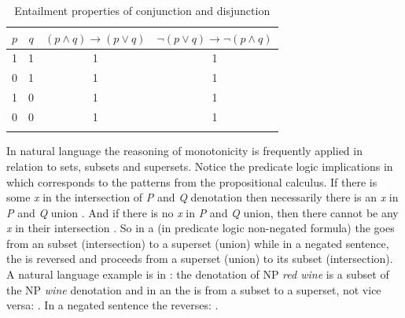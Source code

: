 \documentclass[output=paper, colorlinks, citecolor=brown, newtxmath]{langsci/langscibook}
\begin{document}
\ea \label{ex-10} 
\z
\z

\begin{table}
\begin{tabularx}{0.65\textwidth}{cccc}
\lsptoprule
$p$\strut & $q$\strut & $(p\wedge q)\rightarrow(p\vee q)$\strut & $\neg (p\vee q)\rightarrow\neg(p\wedge q)$\strut
\tabularnewline
\midrule
1\strut & 1\strut & 1\strut & 1\strut \tabularnewline
0\strut & 1\strut & 1\strut & 1\strut \tabularnewline
1\strut & 0\strut & 1\strut & 1\strut \tabularnewline
0\strut & 0\strut & 1\strut & 1\strut \tabularnewline
\lspbottomrule

\end{tabularx}
\caption{Entailment properties of conjunction and disjunction}
     \label{table1}
\end{table}



\noindent In natural language the reasoning of monotonicity is frequently applied in relation to sets, subsets and supersets. Notice the predicate logic implications in  which corresponds to the patterns from the propositional calculus. If there is some \textit{x} in the intersection of \textit{P} and \textit{Q} denotation then necessarily there is an \textit{x} in \textit{P} and \textit{Q} union . And if there is no \textit{x} in \textit{P} and \textit{Q} union, then there cannot be any \textit{x} in their intersection . So in a  (in predicate logic non-negated formula) the  goes from an subset (intersection) to a superset (union) while in a negated sentence, the  is reversed and proceeds from a superset (union) to its subset (intersection). A natural language example is in : the denotation of NP \textit{red wine} is a subset of the NP \textit{wine} denotation and in an   the  is from a subset to a superset, not vice versa: . In a negated sentence the  reverses: .
\end{document}
